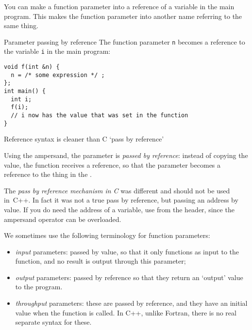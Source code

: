 You can make a function parameter into a reference of a variable in
the main program. This makes the function parameter into another name referring
to the same thing.

\begin{block}{Parameter passing by reference}
  \label{sl:pass-by-ref}
The function parameter \lstinline{n} becomes a reference to the variable \lstinline{i}
in the main program:
\lstset{numbers=left,numberstyle=\tiny}
\begin{lstlisting}
void f(int &n) {
  n = /* some expression */ ;
};
int main() {
  int i;
  f(i);
  // i now has the value that was set in the function
}
\end{lstlisting}
 Reference syntax is cleaner than C `pass by reference'
\end{block}

Using the ampersand, the parameter is
\emph{passed by reference}:
instead of copying the value, the function receives a reference,
so that the parameter becomes a reference to the thing
in the .

\begin{remark}
  The \emph{pass by reference mechanism in C}%
  was different and should not be used in~C++. In fact it was not a
  true pass by reference, but passing an address by value.
  If you do need the address of a variable, use 
  from the  header, since the ampersand operator
  can be overloaded.
\end{remark}

\begin{remark}
  We sometimes use the following terminology for function parameters:
  \begin{itemize}
  \item \emph{input} parameters: passed by
    value, so that it only functions as input to the function, and no
    result is output through this parameter;
  \item \emph{output} parameters: passed
    by reference so that they return an `output' value to the program.
  \item \emph{throughput} parameters:
    these are passed by reference, and they have an initial value when
    the function is called. In C++, unlike Fortran, there is no real
    separate syntax for these.
  \end{itemize}
\end{remark}


